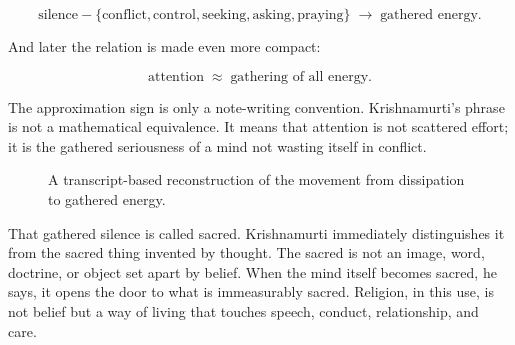 \begin{equation}
\text{silence}
-
\{\text{conflict},\text{control},\text{seeking},\text{asking},\text{praying}\}
\;\longrightarrow\;
\text{gathered energy}.
\end{equation}

And later the relation is made even more compact:

\begin{equation}
\text{attention}
\;\approx\;
\text{gathering of all energy}.
\end{equation}

The approximation sign is only a note-writing convention. Krishnamurti's phrase is not a mathematical equivalence. It means that attention is not scattered effort; it is the gathered seriousness of a mind not wasting itself in conflict.

\begin{figure}
\centering
{}
\caption{A transcript-based reconstruction of the movement from dissipation to gathered energy.}
\end{figure}

That gathered silence is called sacred. Krishnamurti immediately distinguishes it from the sacred thing invented by thought. The sacred is not an image, word, doctrine, or object set apart by belief. When the mind itself becomes sacred, he says, it opens the door to what is immeasurably sacred. Religion, in this use, is not belief but a way of living that touches speech, conduct, relationship, and care.

